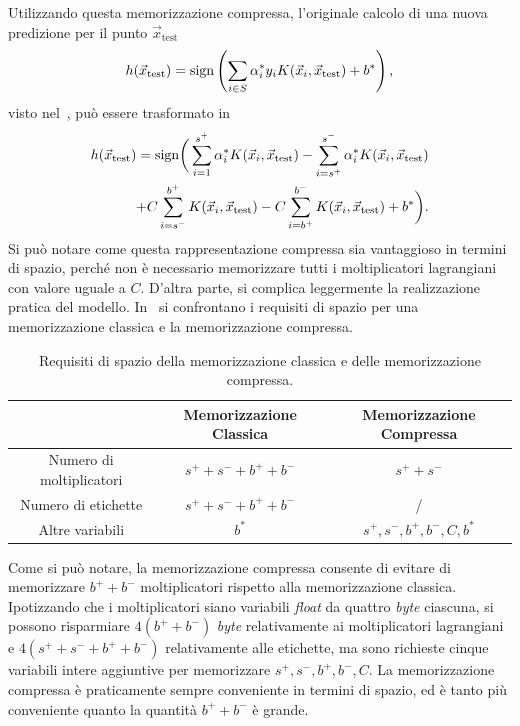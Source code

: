 Utilizzando questa memorizzazione compressa, l'originale calcolo di una nuova predizione per il punto $\Vec{x}_{\text{test}}$
\begin{equation*}
    h(\Vec{x}_{\text{test}}) = \mathrm{sign}\left(\sum_{i \in S}\alpha_i^*y_iK(\Vec{x}_i, \Vec{x}_\text{test}) + b^*\right),
\end{equation*}
visto nel~, può essere trasformato in
\begin{align*}
    h(\Vec{x}_{\text{test}}) = \mathrm{sign}\bigg(
            \sum_{i=1}^{s^+}\alpha_i^*K(\Vec{x}_i, \Vec{x}_\text{test}) 
            -\sum_{i=s^+}^{s^-}\alpha_i^*K(\Vec{x}_i, \Vec{x}_\text{test})\\
            +C\sum_{i=s^-}^{b^+}K(\Vec{x}_i, \Vec{x}_\text{test})
            -C\sum_{i=b^+}^{b^-}K(\Vec{x}_i, \Vec{x}_\text{test}) 
            + b^*
        \bigg).
\end{align*}
Si può notare come questa rappresentazione compressa sia vantaggioso in termini di spazio, perché non è necessario memorizzare tutti i moltiplicatori lagrangiani con valore uguale a $C$.
D'altra parte, si complica leggermente la realizzazione pratica del modello.
In~ si confrontano i requisiti di spazio per una memorizzazione classica e la memorizzazione compressa.
\begin{table}
    \centering
    \begin{tabular}{c|c|c}
    \multicolumn{1}{c}{}    &  Memorizzazione Classica    & Memorizzazione Compressa \\     
    \toprule
    Numero di moltiplicatori    & $s^+ + s^- + b^+ + b^-$ & $s^+ +s^-$ \\
    \hline
    Numero di etichette         & $s^+ + s^- + b^+ + b^-$ &  / \\
    \hline
    Altre variabili             &         $b^*$          &  $s^+, s^-, b^+, b^-, C, b^*$ \\
    \bottomrule
    \end{tabular}
    \caption{Requisiti di spazio della memorizzazione classica e delle memorizzazione compressa.}
    \label{tab:compressione_spazio_risparmiato}
\end{table}
Come si può notare, la memorizzazione compressa consente di evitare di memorizzare $b^++b^-$ moltiplicatori rispetto alla memorizzazione classica.
Ipotizzando che i moltiplicatori siano variabili \emph{float} da quattro \emph{byte} ciascuna, si possono risparmiare $4(b^++b^-)$ \emph{byte} relativamente ai moltiplicatori lagrangiani e $4(s^+ + s^- + b^+ + b^-)$ relativamente alle etichette, ma sono richieste cinque variabili intere aggiuntive per memorizzare $s^+, s^-, b^+, b^-, C$.
La memorizzazione compressa è praticamente sempre conveniente in termini di spazio, ed è tanto più conveniente quanto la quantità $b^++b^-$ è grande.

